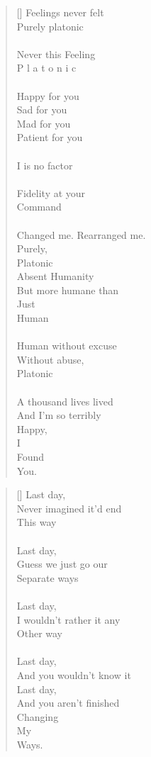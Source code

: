 \documentclass{article}
\begin{document}
\settowidth{\versewidth}{Than Tycho Brahe, or Erra Pater:}
\begin{verse}[\versewidth]
Feelings never felt \\
Purely platonic \\
\\
Never this Feeling \\
P  l  a  t  o  n  i  c \\
\\
Happy for you \\
Sad for you \\
Mad for you \\
Patient for you \\
\\
I is no factor \\
\\
Fidelity at your \\
Command \\
\\
Changed me. Rearranged me. \\
Purely, \\
Platonic \\
Absent Humanity \\
But more humane than \\
Just \\
Human \\
\\
Human without excuse \\
Without abuse, \\
Platonic \\
\\
A thousand lives lived \\
And I'm so terribly \\
Happy, \\
I \\
Found \\
You. \\
\end{verse}

\settowidth{\versewidth}{Than Tycho Brahe, or Erra Pater:}
\begin{verse}[\versewidth]
Last day, \\
Never imagined it'd end \\
This way \\
\\
Last day, \\
Guess we just go our \\
Separate ways \\
\\
Last day, \\
I wouldn't rather it any \\
Other way \\
\\
Last day, \\
And you wouldn't know it \\
Last day, \\
And you aren't finished \\
Changing \\
My \\
Ways. \\
\end{verse}
\end{document}
